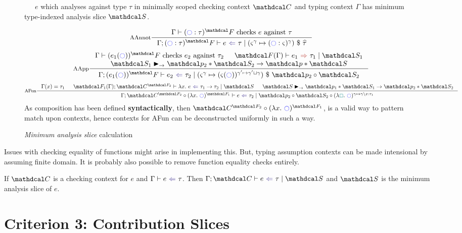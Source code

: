 \begin{figure}[h]
\ \ \ $e$ which analyses against type $\tau$ in minimally scoped checking context $\C$ and typing context $\Gamma$ has minimum type-indexed analysis slice $\S$.

\[\inference[AAnnot]{\Gamma \vdash (\cmark : \tau)^\F \text{ checks } e \text{ against } \tau}{\analysisslice{(\cmark : \tau)^\F}{e}{\tau}{(\varsigma^\gamma \mapsto (\cmark : \varsigma)^\gamma)\ \$\ \widehat{\tau}}}\]
\[\inference[AApp]{\Gamma \vdash (e_1(\cmark))^\F \text{ checks } e_2 \text{ against } \tau_2 & \synthesisslice[\F(\Gamma)]{e_1}{\tau_1}{\S_1}\\ \S_1 \funmatch \p_2*\S_2 \to \p*\S}{\analysisslice{(e_1(\cmark))^\F}{e_2}{\tau_2}{(\varsigma^\gamma \mapsto (\varsigma(\cmark))^{\gamma' \mapsto \gamma' \sqcup \gamma})\ \$\ \p_2 \circ \S_2}}\]
\[\inference[AFun]{\Gamma(x) = \tau_1 & \analysisslice[\F_1(\Gamma)]{\C^{\F_2}}{\lambda x.\ e}{\tau_1 \to \tau_2}{\S} & \S \funmatch \p_1*\S_1 \to \p_2*\S_2}{\analysisslice[\Gamma]{\C^{\F_2} \circ (\lambda x.\ \cmark)^{\F_1}}{e}{\tau_2}{\p_2 \circ \S_2 \circ (\lambda \gap.\ \cmark)^{\gamma \mapsto \gamma\backslash x:\tau_1}}}\]
As composition has been defined \textbf{syntactically}, then $\C^{\F_2} \circ (\lambda x.\ \cmark)^{\F_1}$, is a valid way to pattern match upon contexts, hence contexts for AFun can be deconstructed uniformly in such a way.
\caption{\textit{Minimum analysis slice} calculation}
\label{fig:AnalsisSlices}
\end{figure}
Issues with checking equality of functions might arise in implementing this. But, typing assumption contexts can be made intensional by assuming finite domain. It is probably also possible to remove function equality checks entirely.

\begin{conjecture}[Correctness]\label{conj:AnalysisSliceCorrectness}
If $\C$ is a checking context for $e$ and $\analysis{e}{\tau}$. Then $\analysisslice{\C}{e}{\tau}{\S}$ and $\S$ is the minimum analysis slice of $e$.
\end{conjecture}

\section{Criterion 3: Contribution Slices}

